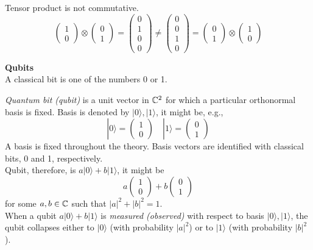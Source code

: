 \begin{definition}
    Tensor product is not commutative.
    $$
    \begin{pmatrix} 1 \\ 0 \end{pmatrix}
    \otimes
    \begin{pmatrix} 0 \\ 1 \end{pmatrix}
    =
    \begin{pmatrix} 0 \\ 1 \\ 0 \\ 0 \end{pmatrix}
    \neq
    \begin{pmatrix} 0 \\ 0 \\ 1 \\ 0 \end{pmatrix}
    =
    \begin{pmatrix} 0 \\ 1 \end{pmatrix}
    \otimes
    \begin{pmatrix} 1 \\ 0 \end{pmatrix}
    $$
\end{definition}

\textbf{Qubits}\\
A classical bit is one of the numbers 0 or 1.
\begin{definition}
    \textit{Quantum bit (qubit)} is a unit vector in $\mathbb{C}^2$
    for which a particular orthonormal basis is fixed.
    Basis is denoted by $|0\rangle, |1\rangle$, it might be, e.g.,
    $$ |0\rangle = \begin{pmatrix} 1 \\ 0 \end{pmatrix}
        \quad
       |1\rangle = \begin{pmatrix} 0 \\ 1 \end{pmatrix}$$
    A basis is fixed throughout the theory.
    Basis vectors are identified with classical bits, 0 and 1, respectively.\\

    Qubit, therefore, is $a|0\rangle + b|1\rangle$,
    it might be
    $$a\begin{pmatrix} 1 \\ 0 \end{pmatrix} + b\begin{pmatrix} 0 \\ 1 \end{pmatrix}$$
    for some $a,b \in \mathbb{C}$ such that $|a|^2 + |b|^2 = 1$.\\

    When a qubit $a|0\rangle + b|1\rangle$ is \textit{measured (observed)}
    with respect to basis $|0\rangle, |1\rangle$,
    the qubit collapses either
    to $|0\rangle$ (with probability $|a|^2$) or
    to $|1\rangle$ (with probability $|b|^2$).
\end{definition}

